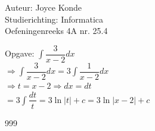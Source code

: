 \documentclass[a4paper]{article}
\begin{document}
  
\noindent \large Auteur: Joyce Konde \\
\noindent \large Studierichting: Informatica\\
\noindent \large Oefeningenreeks 4A nr. 25.4\\

\medskip

\normalsize

\newcommand{\dint}{\displaystyle\int}

\medskip

\normalsize

Opgave: $\dint \dfrac{3}{x-2}dx$\\

$\Rightarrow \dint \dfrac{3}{x-2}dx = 3\dint \dfrac{1}{x-2}dx$\\

$\Rightarrow t = x - 2 \Rightarrow dx = dt $\\

$= 3\dint \dfrac{dt}{t} = 3 \ln |t| + c = 3 \ln |x-2| + c$\\

\begin{thebibliography}{999}
\end{thebibliography}
\end{document}
